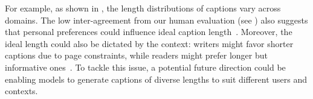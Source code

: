 For example, as shown in , the length distributions of captions vary across domains.
%
The low inter-agreement from our human evaluation (see ) also suggests that personal preferences could influence ideal caption length~\cite{lundgard2021accessible}.
%
Moreover, the ideal length could also be dictated by the context: writers might favor shorter captions due to page constraints, while readers might prefer longer but informative ones~\cite{stokes2022text,sun-etal-2019-compare}.
To tackle this issue, a potential future direction could be enabling models to generate captions of diverse lengths to suit different users and contexts.

